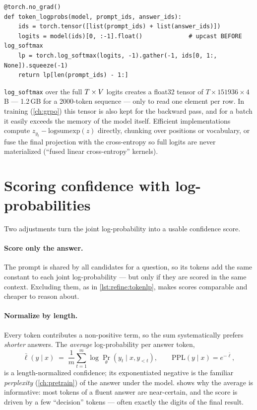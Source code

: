 \begin{lstlisting}[caption={Per-token log-probabilities in one pass (\texttt{llmsys/tts.py}).},label={lst:refine:tokenlp}]
@torch.no_grad()
def token_logprobs(model, prompt_ids, answer_ids):
    ids = torch.tensor([list(prompt_ids) + list(answer_ids)])
    logits = model(ids)[0, :-1].float()             # upcast BEFORE log_softmax
    lp = torch.log_softmax(logits, -1).gather(-1, ids[0, 1:, None]).squeeze(-1)
    return lp[len(prompt_ids) - 1:]
\end{lstlisting}

\begin{systemslens}
\texttt{log\_softmax} over the full $T \times V$ logits creates a float32 tensor of
$T \times \num{151936} \times 4$\,B --- 1.2\,GB for a 2000-token sequence --- only to read one element
per row. In training (\cref{ch:grpo}) this tensor is also kept for the backward pass, and for a batch
it easily exceeds the memory of the model itself. Efficient implementations compute
$z_{y_t} - \mathrm{logsumexp}(z)$ directly, chunking over positions or vocabulary, or fuse the final
projection with the cross-entropy so full logits are never materialized (``fused linear
cross-entropy'' kernels).
\end{systemslens}

\section{Scoring confidence with log-probabilities}\label{sec:refine:confidence}


Two adjustments turn the joint log-probability into a usable confidence score.

\paragraph{Score only the answer.} The prompt is shared by all candidates for a question, so its
tokens add the same constant to each joint log-probability --- but only if they are scored in the
same context. Excluding them, as in \cref{lst:refine:tokenlp}, makes scores comparable and cheaper
to reason about.

\paragraph{Normalize by length.} Every token contributes a non-positive term, so the sum
systematically prefers \emph{shorter} answers. The \emph{average} log-probability per answer token,
\begin{equation}
  \bar\ell(y \mid x) \;=\; \frac{1}{m}\sum_{t=1}^{m} \log \Pr_\theta(y_t \mid x, y_{<t}),
  \qquad \mathrm{PPL}(y \mid x) = e^{-\bar\ell},
  \label{eq:refine:avg}
\end{equation}
is a length-normalized confidence; its exponentiated negative is the familiar \emph{perplexity}
(\cref{ch:pretrain}) of the answer under the model.  shows why the average
is informative: most tokens of a fluent answer are near-certain, and the score is driven by a few
``decision'' tokens --- often exactly the digits of the final result.

